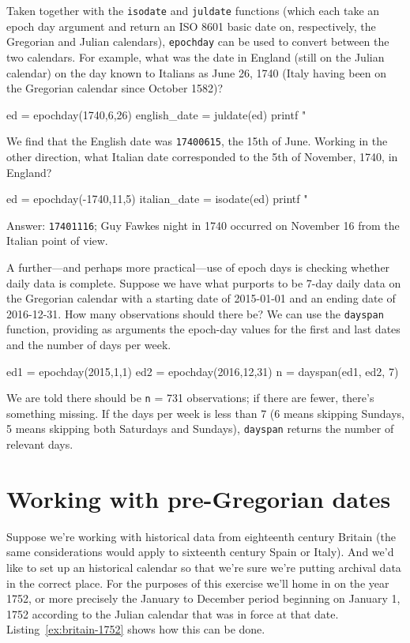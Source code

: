 Taken together with the \texttt{isodate} and \texttt{juldate}
functions (which each take an epoch day argument and return an ISO
8601 basic date on, respectively, the Gregorian and Julian calendars),
\texttt{epochday} can be used to convert between the two calendars.
For example, what was the date in England (still on the Julian
calendar) on the day known to Italians as June 26, 1740 (Italy having
been on the Gregorian calendar since October 1582)?
%
\begin{code}
ed = epochday(1740,6,26)
english_date = juldate(ed)
printf "%
\end{code}
%
We find that the English date was \texttt{17400615}, the 15th of June.
Working in the other direction, what Italian date corresponded to the
5th of November, 1740, in England?
%
\begin{code}
ed = epochday(-1740,11,5)
italian_date = isodate(ed)
printf "%
\end{code}
%
Answer: \texttt{17401116}; Guy Fawkes night in 1740 occurred on 
November 16 from the Italian point of view.

A further---and perhaps more practical---use of epoch days is checking
whether daily data is complete. Suppose we have what purports to be
7-day daily data on the Gregorian calendar with a starting date of
2015-01-01 and an ending date of 2016-12-31. How many observations
should there be? We can use the \texttt{dayspan} function, providing
as arguments the epoch-day values for the first and last dates and the
number of days per week.
\begin{code}
ed1 = epochday(2015,1,1)
ed2 = epochday(2016,12,31)
n = dayspan(ed1, ed2, 7)
\end{code}
%
We are told there should be \texttt{n} = 731 observations; if there
are fewer, there's something missing. If the days per week is less
than 7 (6 means skipping Sundays, 5 means skipping both Saturdays and
Sundays), \texttt{dayspan} returns the number of relevant days.


\section{Working with pre-Gregorian dates}
\label{cal-conversion}

Suppose we're working with historical data from eighteenth century
Britain (the same considerations would apply to sixteenth century
Spain or Italy). And we'd like to set up an historical calendar so
that we're sure we're putting archival data in the correct place.
For the purposes of this exercise we'll home in on the year 1752,
or more precisely the January to December period beginning on January
1, 1752 according to the Julian calendar that was in force at that
date. Listing~\ref{ex:britain-1752} shows how this can be done.

